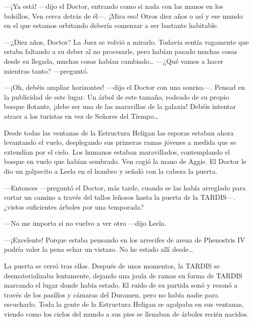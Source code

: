 ---¡Ya está! ---dijo el Doctor, entrando como si nada con las manos en
los bolsillos, Ven cerca detrás de él---. ¡Mira eso! Otros diez años o
así y ese mundo en el que estamos orbitando debería comenzar a ser
bastante habitable.

---¿Diez años, Doctor? La Juez se volvió a mirarlo. Todavía sentía
vagamente que estaba faltando a su deber al no procesarle, pero habían
pasado muchas cosas desde su llegada, muchas cosas habían
cambiado\ldots{} ---¿Qué vamos a hacer mientras tanto? ---preguntó.

---¡Oh, debéis ampliar horizontes! ---dijo el Doctor con una sonrisa---.
Pensad en la publicidad de este lugar. Un árbol de este tamaño, rodeado
de su propio bosque flotante, ¡debe ser una de las maravillas de la
galaxia! Debéis intentar atraer a los turistas en vez de Señores del
Tiempo\ldots{}

Desde todas las ventanas de la Estructura Heligan las esporas estaban
ahora levantando el vuelo, desplegando sus primeras ramas jóvenes a
medida que se extendían por el cielo. Los humanos estaban maravillados,
contemplando el bosque en vuelo que habían sembrado. Ven cogió la mano
de Aggie. El Doctor le dio un golpecito a Leela en el hombro y señaló
con la cabeza la puerta.

---Entonces ---preguntó el Doctor, más tarde, cuando se las había
arreglado para cortar un camino a través del tallos leñosos hasta la
puerta de la TARDIS---. ¿vistos suficientes árboles por una temporada?

---No me importa si no vuelvo a ver otro ---dijo Leela.

---¡Excelente! Porque estaba pensando en los arrecifes de arena de
Phenostris IV podría valer la pena echar un vistazo. No he estado allí
desde\ldots{}

La puerta se cerró tras ellos. Después de unos momentos, la TARDIS se
desmaterializaba lentamente, dejando una jaula de ramas en forma de
TARDIS marcando el lugar donde había estado. El ruido de su partida sonó
y resonó a través de los pasillos y cámaras del Duramen, pero no había
nadie para escucharlo. Toda la gente de la Estructura Heligan se
agolpaba en sus ventanas, viendo como los cielos del mundo a sus pies se
llenaban de árboles recién nacidos.